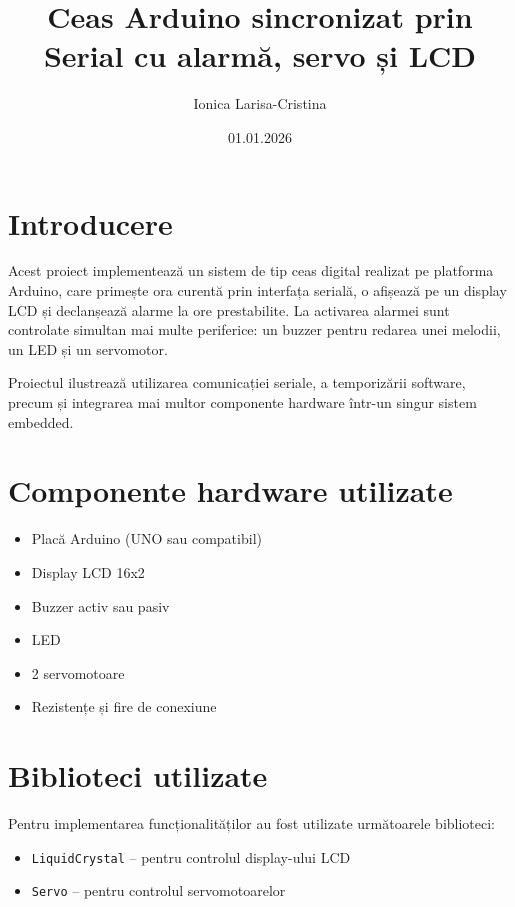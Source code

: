 \documentclass[12pt,a4paper]{article}
\title{\textbf{Ceas Arduino sincronizat prin Serial cu alarmă, servo și LCD}}
\author{Ionica Larisa-Cristina}
\date{01.01.2026}
\begin{document}
\maketitle

\section{Introducere}
Acest proiect implementează un sistem de tip ceas digital realizat pe platforma Arduino, care primește ora curentă prin interfața serială, o afișează pe un display LCD și declanșează alarme la ore prestabilite. La activarea alarmei sunt controlate simultan mai multe periferice: un buzzer pentru redarea unei melodii, un LED și un servomotor.

Proiectul ilustrează utilizarea comunicației seriale, a temporizării software, precum și integrarea mai multor componente hardware într-un singur sistem embedded.

\section{Componente hardware utilizate}
\begin{itemize}
    \item Placă Arduino (UNO sau compatibil)
    \item Display LCD 16x2
    \item Buzzer activ sau pasiv
    \item LED
    \item 2 servomotoare
    \item Rezistențe și fire de conexiune
\end{itemize}

\section{Biblioteci utilizate}
Pentru implementarea funcționalităților au fost utilizate următoarele biblioteci:
\begin{itemize}
    \item \texttt{LiquidCrystal} – pentru controlul display-ului LCD
    \item \texttt{Servo} – pentru controlul servomotoarelor
\end{itemize}
\end{document}
